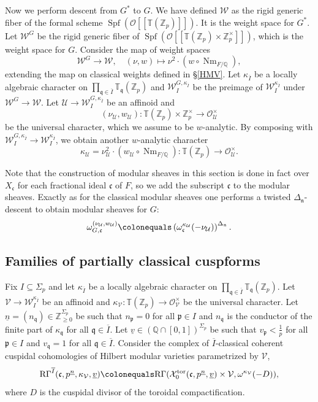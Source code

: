 \documentclass[11pt]{amsart}
\theoremstyle{definition} %
\theoremstyle{plain} %
\theoremstyle{remark} %
\newcommand{\QQ}{{\mathbb Q}}
\newcommand{\TT}{{\mathbb T}}
\newcommand{\ZZ}{{\mathbb Z}}
\newcommand{\cO}{{\mathcal O}}
\newcommand{\cU}{{\mathcal U}}
\newcommand{\cV}{{\mathcal V}}
\newcommand{\cW}{{\mathcal W}}
\newcommand{\cX}{{\mathcal X}}
\newcommand{\frakc}{\mathfrak c}
\newcommand{\frakn}{\mathfrak n}
\newcommand{\frakp}{\mathfrak p}
\newcommand{\frakq}{\mathfrak q}
\newcommand{\defeq}{\colonequals} %
\DeclareMathOperator\Spf{Spf} %
\newcommand{\tor}{\mathrm{tor}} %
\DeclareMathOperator\Nm{Nm} %
\newcommand{\RG}{\mathrm{R\Gamma}}
\begin{document}
Now we perform descent from $G^\ast$ to $G$.
We have defined $\cW$ as the rigid generic fiber of the formal scheme $\Spf(\cO[\![\TT(\ZZ_p)]\!])$.
It is the weight space for $G^\ast$.
Let $\cW^G$ be the rigid generic fiber of $\Spf(\cO[\![\TT(\ZZ_p)\times\ZZ_p^\times]\!])$, which is the weight space for $G$.
Consider the map of weight spaces 
\[\cW^G\rightarrow\cW, \quad (\nu,w)\mapsto  \nu^2 \cdot (w\circ\Nm_{F/\QQ}), \] 
 extending the map on classical weights defined in \S\ref{HMV}.
Let $\kappa_{\overline{I}}$ be a locally algebraic character on $\prod_{\frakq\in \overline{I}} \TT_{\frakq}(\ZZ_p)$ and 
 $\cW_{I}^{G,\kappa_{\overline{I}}}$ be the preimage of $\cW_{I}^{\kappa_{\overline{I}}}$ under $\cW^G \rightarrow \cW$.
Let $\cU\rightarrow\cW_{I}^{G,\kappa_{\overline{I}}}$ be an affinoid and
\[
(\nu_\cU,w_\cU)\colon \TT(\ZZ_p)\times\ZZ_p^\times \rightarrow \cO_\cU^\times
\]
be the universal character, which we assume to be $w$-analytic.
By composing with $\cW_{I}^{G,\kappa_{\overline{I}}} \rightarrow \cW_{I}^{\kappa_{\overline{I}}}$, we obtain another $w$-analytic
character 
\[
\kappa_\cU=\nu_\cU^2 \cdot (w_\cU\circ \Nm_{F/\QQ}) \colon   \TT(\ZZ_p) \rightarrow \cO_\cU^\times.
\]

Note that the construction of modular sheaves in this section is done in fact over $X_\frakc$ for each fractional ideal $\frakc$ of $F$, so we add the subscript $\frakc$ to the modular sheaves.
Exactly as for the 
classical modular sheaves one performs a twisted 
$\Delta_\frakn$-descent to obtain modular sheaves for $G$:
\[
\omega_{G,\frakc}^{(\nu_\cU,w_\cU)} \defeq \left(\omega_\frakc^{\kappa_\cU}(-\nu_\cU)\right)^{\Delta_{\frakn}}.
\]




\subsection{Families of partially classical cuspforms}
Fix  $I\subseteq \Sigma_p$ and let $\kappa_{\overline{I}}$ be a locally algebraic character on $\prod_{\frakq\in \overline{I}} \TT_{\frakq}(\ZZ_p)$.
Let $\cV\rightarrow \cW_{I}^{\kappa_{\overline{I}}}$ be an affinoid and $\kappa_{\cV}\colon \TT(\ZZ_p) \rightarrow \cO_{\cV}^\times$ be the universal character.
Let $\underline{n} = (n_\frakq)\in \ZZ_{\geqslant 0}^{\Sigma_p}$ be such that $n_\frakp=0$ for all $\frakp\in I$ and $n_\frakq$ is the conductor of the finite part of $\kappa_\frakq$ for all $\frakq\in\overline{I}$.
Let $\underline{v}\in(\QQ\cap[0,1])^{\Sigma_p}$ be such that $ v_\frakp<\frac{1}{p}$  for all $\frakp\in I$ and  $v_\frakq = 1$ for all $\frakq\in\overline{I}$.
Consider the complex of  $\overline{I}$-classical coherent cuspidal cohomologies of Hilbert modular varieties parametrized by $\cV$,
\[
  \RG^{\overline{I}}(\frakc,p^{\underline{n}}, \kappa_\cV,\underline{v})
\defeq 
\RG(\cX_0^\tor(\frakc,p^{\underline{n}},\underline{v})\times \cV, \omega^{\kappa_\cV}(-D)),
\] 
where $D$ is the cuspidal divisor of the toroidal compactification.
\end{document}
